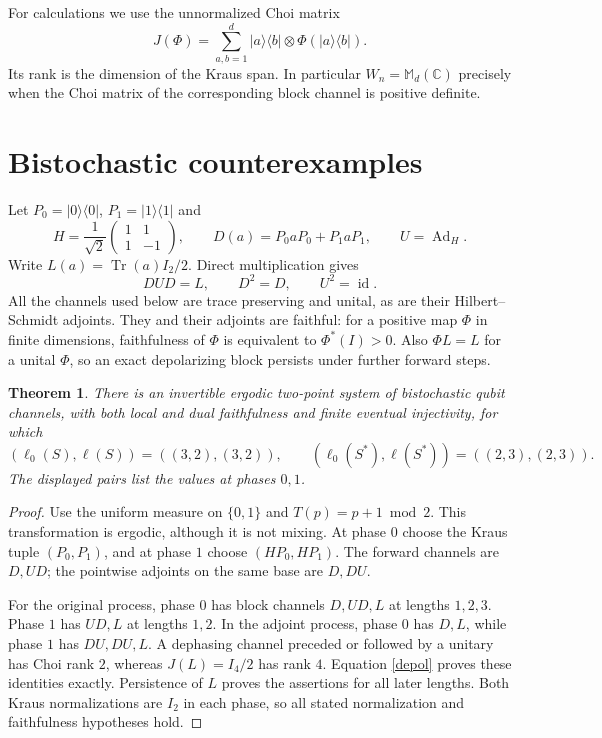 \documentclass[11pt,a4paper]{article}
\newtheorem{theorem}{Theorem}
\newcommand{\M}{\mathbb M_d(\mathbb C)}
\newcommand{\Ad}{\operatorname{Ad}}
\newcommand{\tr}{\operatorname{Tr}}
\newcommand{\id}{\operatorname{id}}
\begin{document}
For calculations we use the unnormalized Choi matrix
\[
 J(\Phi)=\sum_{a,b=1}^d |a\rangle\langle b|\otimes\Phi(|a\rangle\langle b|).
\]
Its rank is the dimension of the Kraus span. In particular $W_n=\M$ precisely when the Choi matrix of the corresponding block channel is positive definite.

\section{Bistochastic counterexamples}
Let $P_0=|0\rangle\langle0|$, $P_1=|1\rangle\langle1|$ and
\[
 H=\frac1{\sqrt2}\begin{pmatrix}1&1\\1&-1\end{pmatrix},\qquad
 D(a)=P_0aP_0+P_1aP_1,\qquad U=\Ad_H.
\]
Write $L(a)=\tr(a)I_2/2$. Direct multiplication gives
\begin{equation}\label{depol}
 DUD=L,\qquad D^2=D,\qquad U^2=\id.
\end{equation}
All the channels used below are trace preserving and unital, as are their Hilbert--Schmidt adjoints. They and their adjoints are faithful: for a positive map $\Phi$ in finite dimensions, faithfulness of $\Phi$ is equivalent to $\Phi^*(I)>0$. Also $\Phi L=L$ for a unital $\Phi$, so an exact depolarizing block persists under further forward steps.

\begin{theorem}\label{two}
There is an invertible ergodic two-point system of bistochastic qubit channels, with both local and dual faithfulness and finite eventual injectivity, for which
\[
 (\ell_0(S),\ell(S))=((3,2),(3,2)),\qquad
 (\ell_0(S^*),\ell(S^*))=((2,3),(2,3)).
\]
The displayed pairs list the values at phases $0,1$.
\end{theorem}
\begin{proof}
Use the uniform measure on $\{0,1\}$ and $T(p)=p+1\bmod2$. This transformation is ergodic, although it is not mixing. At phase $0$ choose the Kraus tuple $(P_0,P_1)$, and at phase $1$ choose $(HP_0,HP_1)$. The forward channels are $D,UD$; the pointwise adjoints on the same base are $D,DU$.

For the original process, phase $0$ has block channels $D,UD,L$ at lengths $1,2,3$. Phase $1$ has $UD,L$ at lengths $1,2$. In the adjoint process, phase $0$ has $D,L$, while phase $1$ has $DU,DU,L$. A dephasing channel preceded or followed by a unitary has Choi rank $2$, whereas $J(L)=I_4/2$ has rank $4$. Equation \eqref{depol} proves these identities exactly. Persistence of $L$ proves the assertions for all later lengths. Both Kraus normalizations are $I_2$ in each phase, so all stated normalization and faithfulness hypotheses hold.
\end{proof}
\end{document}
